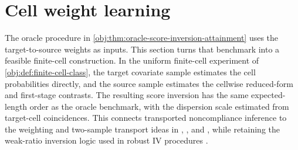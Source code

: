 \section{Cell weight learning}

The oracle procedure in \cref{obj:thm:oracle-score-inversion-attainment} uses the target-to-source weights as inputs. This section turns that benchmark into a feasible finite-cell construction. In the uniform finite-cell experiment of \cref{obj:def:finite-cell-class}, the target covariate sample estimates the cell probabilities directly, and the source sample estimates the cellwise reduced-form and first-stage contrasts. The resulting score inversion has the same expected-length order as the oracle benchmark, with the dispersion scale estimated from target-cell coincidences. This connects transported noncompliance inference to the weighting and two-sample transport ideas in \citet{RudolphVanderLaan2017}, \citet{ChenHuang2025}, and \citet{ZengKennedyBodnarNaimi2024}, while retaining the weak-ratio inversion logic used in robust IV procedures \citep{ChoiGuShen2018,ChoiShen2019}.


